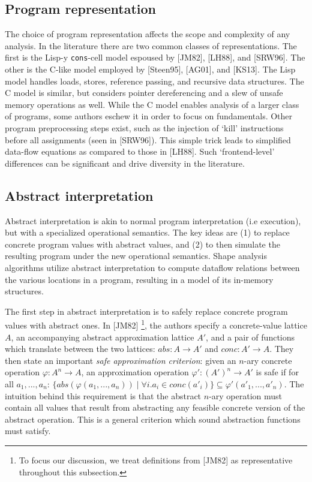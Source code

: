 \documentclass{article}
\begin{document}
\subsection{Program representation}

The choice of program representation affects the scope and complexity of any
analysis. In the literature there are two common classes of representations.
The first is the Lisp-y \texttt{cons}-cell model espoused by [JM82], [LH88],
and [SRW96]. The other is the C-like model employed by [Steen95], [AG01],
and [KS13]. The Lisp model handles loads, stores, reference passing, and
recursive data structures.  The C model is similar, but considers pointer
dereferencing and a slew of unsafe memory operations as well. While the C
model enables analysis of a larger class of programs, some authors eschew it
in order to focus on fundamentals.  Other program preprocessing steps exist,
such as the injection of `kill' instructions before all assignments (seen in
[SRW96]). This simple trick leads to simplified data-flow equations as
compared to those in [LH88]. Such `frontend-level' differences can be
significant and drive diversity in the literature.

\subsection{Abstract interpretation}

Abstract interpretation is akin to normal program interpretation (i.e
execution), but with a specialized operational semantics. The key ideas are
(1) to replace concrete program values with abstract values, and (2) to then
simulate the resulting program under the new operational semantics. Shape
analysis algorithms utilize abstract interpretation to compute dataflow
relations between the various locations in a program, resulting in a model
of its in-memory structures.

The first step in abstract interpretation is to safely replace concrete
program values with abstract ones. In [JM82] \footnote{To focus our
discussion, we treat definitions from [JM82] as representative throughout 
this subsection.}, the authors specify a concrete-value lattice $A$, an
accompanying abstract approximation lattice $A'$, and a pair of functions
which translate between the two lattices: $abs : A \rightarrow A'$ and $conc
: A' \rightarrow A$. They then state an important \textit{safe approximation
criterion}: given an $n$-ary concrete operation $\varphi : A^n \rightarrow
A$, an approximation operation $\varphi' : (A')^n \rightarrow A'$ is safe if
for all $a_1, ..., a_n$: $\{abs(\varphi(a_1, ..., a_n)) \mid \forall i.  a_i
\in conc(a'_i)\} \subseteq \varphi'(a'_1, ..., a'_n)$. The intuition behind
this requirement is that the abstract $n$-ary operation must contain all
values that result from abstracting any feasible concrete version of the
abstract operation.  This is a general criterion which sound abstraction
functions must satisfy.
\end{document}
